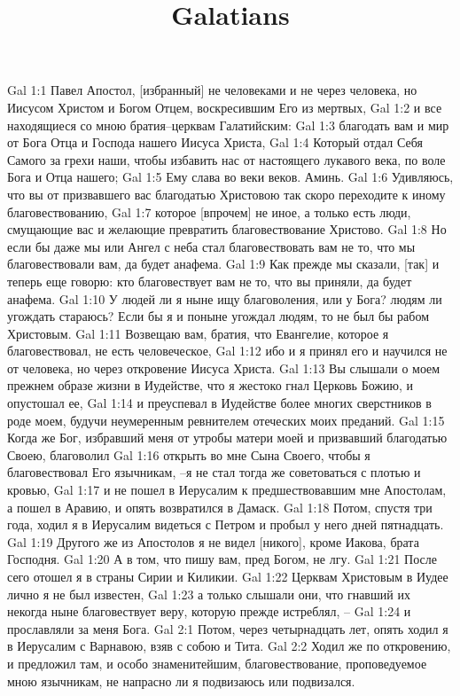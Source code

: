 

\title{Galatians}

Gal 1:1  Павел Апостол, [избранный] не человеками и не через человека, но Иисусом Христом и Богом Отцем, воскресившим Его из мертвых,
Gal 1:2  и все находящиеся со мною братия--церквам Галатийским:
Gal 1:3  благодать вам и мир от Бога Отца и Господа нашего Иисуса Христа,
Gal 1:4  Который отдал Себя Самого за грехи наши, чтобы избавить нас от настоящего лукавого века, по воле Бога и Отца нашего;
Gal 1:5  Ему слава во веки веков. Аминь.
Gal 1:6  Удивляюсь, что вы от призвавшего вас благодатью Христовою так скоро переходите к иному благовествованию,
Gal 1:7  которое [впрочем] не иное, а только есть люди, смущающие вас и желающие превратить благовествование Христово.
Gal 1:8  Но если бы даже мы или Ангел с неба стал благовествовать вам не то, что мы благовествовали вам, да будет анафема.
Gal 1:9  Как прежде мы сказали, [так] и теперь еще говорю: кто благовествует вам не то, что вы приняли, да будет анафема.
Gal 1:10  У людей ли я ныне ищу благоволения, или у Бога? людям ли угождать стараюсь? Если бы я и поныне угождал людям, то не был бы рабом Христовым.
Gal 1:11  Возвещаю вам, братия, что Евангелие, которое я благовествовал, не есть человеческое,
Gal 1:12  ибо и я принял его и научился не от человека, но через откровение Иисуса Христа.
Gal 1:13  Вы слышали о моем прежнем образе жизни в Иудействе, что я жестоко гнал Церковь Божию, и опустошал ее,
Gal 1:14  и преуспевал в Иудействе более многих сверстников в роде моем, будучи неумеренным ревнителем отеческих моих преданий.
Gal 1:15  Когда же Бог, избравший меня от утробы матери моей и призвавший благодатью Своею, благоволил
Gal 1:16  открыть во мне Сына Своего, чтобы я благовествовал Его язычникам, --я не стал тогда же советоваться с плотью и кровью,
Gal 1:17  и не пошел в Иерусалим к предшествовавшим мне Апостолам, а пошел в Аравию, и опять возвратился в Дамаск.
Gal 1:18  Потом, спустя три года, ходил я в Иерусалим видеться с Петром и пробыл у него дней пятнадцать.
Gal 1:19  Другого же из Апостолов я не видел [никого], кроме Иакова, брата Господня.
Gal 1:20  А в том, что пишу вам, пред Богом, не лгу.
Gal 1:21  После сего отошел я в страны Сирии и Киликии.
Gal 1:22  Церквам Христовым в Иудее лично я не был известен,
Gal 1:23  а только слышали они, что гнавший их некогда ныне благовествует веру, которую прежде истреблял, --
Gal 1:24  и прославляли за меня Бога.
Gal 2:1  Потом, через четырнадцать лет, опять ходил я в Иерусалим с Варнавою, взяв с собою и Тита.
Gal 2:2  Ходил же по откровению, и предложил там, и особо знаменитейшим, благовествование, проповедуемое мною язычникам, не напрасно ли я подвизаюсь или подвизался.

